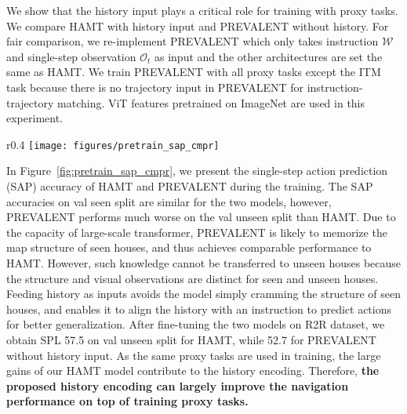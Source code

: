 We show that the history input plays a critical role for training with proxy tasks.
We compare HAMT with history input and PREVALENT \cite{hao2020towards} without history.
For fair comparison, we re-implement PREVALENT which only takes instruction $\mathcal{W}$ and single-step observation $\mathcal{O}_t$ as input and the other architectures are set the same as HAMT.
We train PREVALENT with all proxy tasks except the ITM task because there is no trajectory input in PREVALENT for instruction-trajectory matching.
ViT features pretrained on ImageNet are used in this experiment.


\begin{wrapfigure}{r}{0.4\textwidth}
\centering
	\texttt{[image: figures/pretrain\_sap\_cmpr]}
	\caption{SAP accuracy of PREVALENT (w/o history) and HAMT (w/ history) on R2R dataset.}
	\label{fig:pretrain_sap_cmpr}
\end{wrapfigure}
In Figure~\ref{fig:pretrain_sap_cmpr}, we present the single-step action prediction (SAP) accuracy of HAMT and PREVALENT during the training.
The SAP accuracies on val seen split are similar for the two models, however, PREVALENT performs much worse on the val unseen split than HAMT.
Due to the capacity of large-scale transformer, PREVALENT is likely to memorize the map structure of seen houses, and thus achieves comparable performance to HAMT.
However, such knowledge cannot be transferred to unseen houses because the structure and visual observations are distinct for seen and unseen houses.
Feeding history as inputs avoids the model simply cramming the structure of seen houses, and enables it to align the history with an instruction to predict actions for better generalization.
After fine-tuning the two models on R2R dataset, we obtain SPL 57.5 on val unseen split for HAMT, while 52.7 for PREVALENT without history input.
As the same proxy tasks are used in training, the large gains of our HAMT model contribute to the history encoding.
Therefore, \textbf{the proposed history encoding can largely improve the navigation performance on top of training proxy tasks.}

